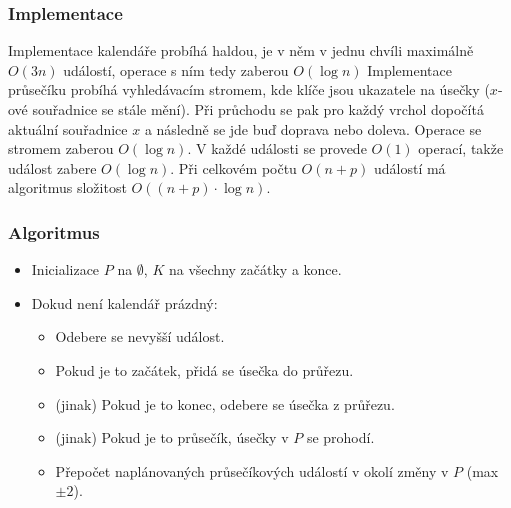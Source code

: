 
\subsubsection{Implementace}

Implementace kalendáře probíhá haldou, je v něm v jednu chvíli maximálně $O(3n)$ událostí, operace s ním tedy zaberou $O(\log n)$
Implementace průsečíku probíhá vyhledávacím stromem, kde klíče jsou ukazatele na úsečky ($x$-ové souřadnice se stále mění).
Při průchodu se pak pro každý vrchol dopočítá aktuální souřadnice $x$ a následně se jde buď doprava nebo doleva.
Operace se stromem zaberou $O(\log n)$.
V každé události se provede $O(1)$ operací, takže událost zabere $O(\log n)$.
Při celkovém počtu $O(n + p)$ událostí má algoritmus složitost $O((n + p) \cdot \log n)$.

\subsubsection{Algoritmus}

\begin{itemize}
    \item Inicializace $P$ na $\emptyset$, $K$ na všechny začátky a konce.
    \item Dokud není kalendář prázdný:

    \begin{itemize}
        \item Odebere se nevyšší událost.
        \item Pokud je to začátek, přidá se úsečka do průřezu.
        \item (jinak) Pokud je to konec, odebere se úsečka z průřezu.
        \item (jinak) Pokud je to průsečík, úsečky v $P$ se prohodí.
        \item Přepočet naplánovaných průsečíkových událostí v okolí změny v $P$ (max $\pm 2$).
    \end{itemize}
\end{itemize}
